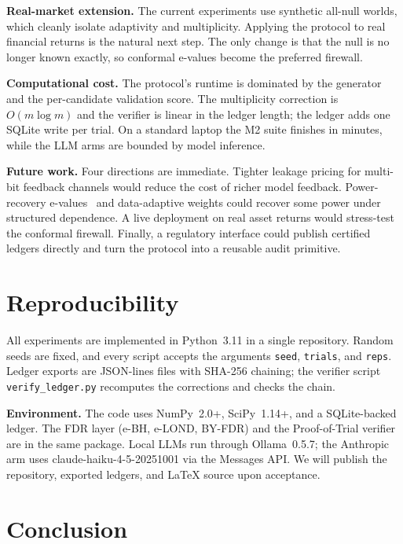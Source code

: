 \documentclass[sigconf]{acmart}
\theoremstyle{plain}
\begin{document}
\textbf{Real-market extension.} The current experiments use synthetic all-null
worlds, which cleanly isolate adaptivity and multiplicity. Applying the
protocol to real financial returns is the natural next step. The only change is
that the null is no longer known exactly, so conformal e-values become the
preferred firewall.

\begin{sloppypar}
\textbf{Computational cost.} The protocol's runtime is dominated by the
generator and the per-candidate validation score. The multiplicity correction
is $O(m\log m)$ and the verifier is linear in the ledger length; the ledger
adds one SQLite write per trial. On a standard laptop the M2 suite finishes in
minutes, while the LLM arms are bounded by model inference.
\end{sloppypar}

\textbf{Future work.} Four directions are immediate. Tighter leakage pricing
for multi-bit feedback channels would reduce the cost of richer model feedback.
Power-recovery e-values~\cite{fischer2024} and data-adaptive weights could
recover some power under structured dependence. A live deployment on real asset
returns would stress-test the conformal firewall. Finally, a regulatory
interface could publish certified ledgers directly and turn the protocol into a
reusable audit primitive.

\section{Reproducibility}\label{sec:reproducibility}

All experiments are implemented in Python~3.11 in a single repository. Random
seeds are fixed, and every script accepts the arguments \texttt{seed},
\texttt{trials}, and \texttt{reps}. Ledger exports are JSON-lines files with
SHA-256 chaining; the verifier script \texttt{verify\_ledger.py} recomputes the
corrections and checks the chain.

\textbf{Environment.} The code uses NumPy~2.0+, SciPy~1.14+, and a
SQLite-backed ledger. The FDR layer (e-BH, e-LOND, BY-FDR) and the
Proof-of-Trial verifier are in the same package. Local LLMs run through
Ollama~0.5.7; the Anthropic arm uses claude-haiku-4-5-20251001 via the
Messages API. We will publish the repository, exported ledgers, and LaTeX
source upon acceptance.

\section{Conclusion}\label{sec:conclusion}
\end{document}
